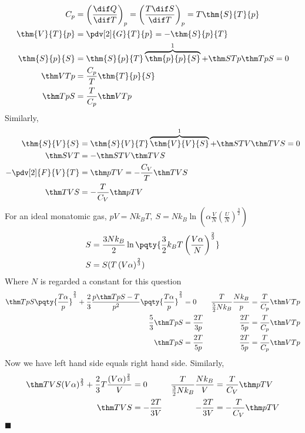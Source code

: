 \documentclass[12pt]{article}
\begin{document}
        \subsection{} {  \begin{align*}
            C_p &= \left(\frac{ \dif Q}{ \dif T}\right)_p =\left(\frac{T \dif S}{ \dif T}\right)_p = T\thm{S}{T}{p}\\
            \thm{V}{T}{p} &=  \pdv[2]{G}{T}{p} = -\thm{S}{p}{T}\\
            \thm{S}{p}{S} &=  \thm{S}{p}{T}\overbrace{\thm{p}{p}{S}}^1 + \thm STp \thm TpS = 0\\
            \thm VTp&= \frac{C_p}{T}\thm{T}{p}{S}\\
            \thm TpS &= \frac{T}{C_p}\thm VTp
        \end{align*}}
        Similarly, \begin{align*}
            \thm{S}{V}{S} &=  \thm{S}{V}{T}\overbrace{\thm{V}{V}{S}}^1 + \thm STV \thm TVS = 0\\
            \thm SVT&= - \thm STV \thm TVS\\
            -\pdv[2]{F}{V}{T} &= \thm pTV = - \frac{C_V}{T}\thm TVS\\
            \thm TVS &=  - \frac{T}{C_V}\thm pTV
        \end{align*}
        For an ideal monatomic gas, \(pV = Nk_BT,\: S = N k_B \ln\left(\alpha\frac{V}{N}\left(\frac{U}{N}\right)^\frac{3}{2}\right)\)
        \begin{align*}
            S &=  \frac{3Nk_B}{2} \ln{\pqty{\frac{3}{2}k_BT\left(\frac{V\alpha}{N}\right)^\frac{2}{3}}}\\
            S &=  S(T\left({V\alpha}\right)^\frac{2}{3})
        \end{align*}
        Where \( N\) is regarded a constant for this question
        \begin{align*}
            \thm TpS \pqty{\frac{T\alpha}{p}}^\frac{2}{3} + \frac{2}{3}\frac{p\thm TpS - T}{p^2} \pqty{\frac{T\alpha}{p}}^\frac{2}{3}  &= 0 & \frac{T}{\frac{5}{2}Nk_B}\frac{Nk_B}{p}&=  \frac{T}{C_p}\thm VTp \\
            \frac{5}{3}\thm TpS &= \frac{2T}{3p}& \frac{2T}{5p}&= \frac{T}{C_p}\thm VTp\\
            \thm TpS &= \frac{2T}{5p}& \frac{2T}{5p}&= \frac{T}{C_p}\thm VTp
        \end{align*}
        Now we have left hand side equals right hand side. Similarly,
        \begin{align*}
            \thm TVS (V\alpha)^\frac{2}{3} +   \frac{2}{3}T\frac{ (V\alpha)^{\frac{2}{3}}}{V} &= 0 & \frac{T}{\frac{3}{2}Nk_B}\frac{Nk_B}{V}&=  \frac{T}{C_V}\thm pTV \\
            \thm TVS &= -\frac{2T}{3V}& -\frac{2T}{3V}&= - \frac{T}{C_V}\thm pTV 
        \end{align*}
        \(\blacksquare\)
\end{document}
